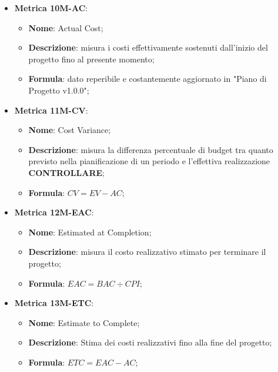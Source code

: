 \begin{itemize}
    \item \textbf{Metrica 10M-AC}:
    \begin{itemize}
        \item \textbf{Nome}: Actual Cost;
        \item \textbf{Descrizione}: misura i costi effettivamente sostenuti dall'inizio del progetto fino al presente momento;
        \item \textbf{Formula}: dato reperibile e costantemente aggiornato in "Piano di Progetto v1.0.0";
    \end{itemize}
\end{itemize}

\begin{itemize}
    \item \textbf{Metrica 11M-CV}:
    \begin{itemize}
        \item \textbf{Nome}: Cost Variance;
        \item \textbf{Descrizione}: misura la differenza percentuale di budget tra quanto previsto nella pianificazione di un periodo e l'effettiva realizzazione \textbf{CONTROLLARE};
        \item \textbf{Formula}: $CV = EV - AC$;
    \end{itemize}
\end{itemize}

\begin{itemize}
    \item \textbf{Metrica 12M-EAC}:
    \begin{itemize}
        \item \textbf{Nome}: Estimated at Completion;
        \item \textbf{Descrizione}: misura il costo realizzativo stimato per terminare il progetto;
        \item \textbf{Formula}: $EAC = BAC \div CPI$;
    \end{itemize}
\end{itemize}

\begin{itemize}
    \item \textbf{Metrica 13M-ETC}:
    \begin{itemize}
        \item \textbf{Nome}: Estimate to Complete;
        \item \textbf{Descrizione}: Stima dei costi realizzativi fino alla fine del progetto;
        \item \textbf{Formula}: $ETC = EAC - AC$;
    \end{itemize}
\end{itemize}

